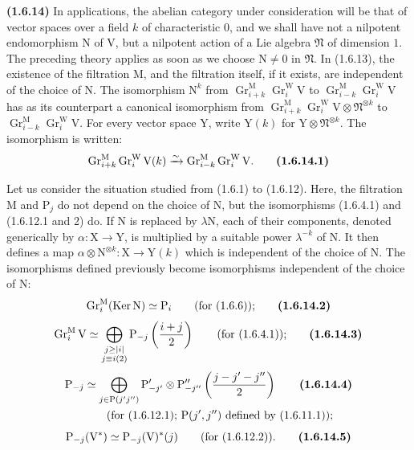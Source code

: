 \documentclass[11pt,leqno]{article}
\newcommand{\Page}[1]{\ifvmode\noindent\else\unskip\ \fi{\footnotesize\textcolor{gray}{[p.\,#1]}}\ \ignorespaces}
\begin{document}
\textbf{(1.6.14)} In applications, the abelian category under consideration will be that of vector spaces over a field \(k\) of characteristic \(0\), and we shall have not a nilpotent endomorphism \(\mathrm{N}\) of \(\mathrm{V}\), but a nilpotent action of a Lie algebra \(\mathfrak{N}\) of dimension \(1\). The preceding theory applies as soon as we choose \(\mathrm{N}\neq0\) in \(\mathfrak{N}\). In (1.6.13), the existence of the filtration \(\mathrm{M}\), and the filtration itself, if it exists, are independent of the choice of \(\mathrm{N}\). The isomorphism \(\mathrm{N}^k\) from \(\operatorname{Gr}_{i+k}^{\mathrm{M}}\operatorname{Gr}_i^{\mathrm{W}}\mathrm{V}\) to \(\operatorname{Gr}_{i-k}^{\mathrm{M}}\operatorname{Gr}_i^{\mathrm{W}}\mathrm{V}\) has as its counterpart a canonical isomorphism from \(\operatorname{Gr}_{i+k}^{\mathrm{M}}\operatorname{Gr}_i^{\mathrm{W}}\mathrm{V}\otimes\mathfrak{N}^{\otimes k}\) to \(\operatorname{Gr}_{i-k}^{\mathrm{M}}\operatorname{Gr}_i^{\mathrm{W}}\mathrm{V}\). For every vector space \(\mathrm{Y}\), write \(\mathrm{Y}(k)\) for \(\mathrm{Y}\otimes\mathfrak{N}^{\otimes k}\). The isomorphism is written:
\[
\operatorname{Gr}_{i+k}^{\mathrm{M}}\operatorname{Gr}_i^{\mathrm{W}}\mathrm{V}(k)
\xrightarrow{\sim}
\operatorname{Gr}_{i-k}^{\mathrm{M}}\operatorname{Gr}_i^{\mathrm{W}}\mathrm{V}.
\tag*{\textbf{(1.6.14.1)}}
\]

Let us consider the situation studied from (1.6.1) to (1.6.12). Here, the filtration \(\mathrm{M}\) and \(\mathrm{P}_j\) do not depend on the choice of \(\mathrm{N}\), but the isomorphisms (1.6.4.1) and (1.6.12.1 and 2) do. If \(\mathrm{N}\) is replaced by \(\lambda\mathrm{N}\), each of their components, denoted generically by \(\alpha:\mathrm{X}\to\mathrm{Y}\), is multiplied by a suitable power \(\lambda^{-k}\) of \(\mathrm{N}\). It then defines a map \(\alpha\otimes\mathrm{N}^{\otimes k}:\mathrm{X}\to\mathrm{Y}(k)\) which is independent of the choice of \(\mathrm{N}\). The isomorphisms defined previously become isomorphisms independent of the choice of \(\mathrm{N}\):
\Page{170}
\[
\operatorname{Gr}_i^{\mathrm{M}}(\operatorname{Ker}\mathrm{N})
\simeq\mathrm{P}_i
\qquad\text{(for (1.6.6));}
\tag*{\textbf{(1.6.14.2)}}
\]
\[
\operatorname{Gr}_i^{\mathrm{M}}\mathrm{V}
\simeq
\bigoplus_{\substack{j\geq|i|\\j\equiv i(2)}}
\mathrm{P}_{-j}\left(\frac{i+j}{2}\right)
\qquad\text{(for (1.6.4.1));}
\tag*{\textbf{(1.6.14.3)}}
\]
\begin{align*}
\mathrm{P}_{-j}
&\simeq
\bigoplus_{j\in\mathrm{P}(j'j'')}
\mathrm{P}'_{-j'}\otimes\mathrm{P}''_{-j''}
\left(\frac{j-j'-j''}{2}\right)
\tag*{\textbf{(1.6.14.4)}}\\
&\qquad\text{(for (1.6.12.1); }\mathrm{P}(j',j'')
\text{ defined by (1.6.11.1));}
\end{align*}
\[
\mathrm{P}_{-j}(\mathrm{V}^*)
\simeq\mathrm{P}_{-j}(\mathrm{V})^*(j)
\qquad\text{(for (1.6.12.2)).}
\tag*{\textbf{(1.6.14.5)}}
\]
\end{document}
